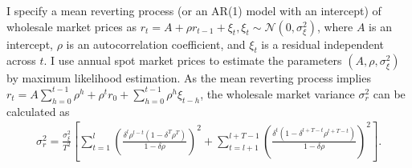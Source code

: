 \documentclass[12pt]{article}
\theoremstyle{definition} %
\begin{document}
I specify a mean reverting process (or an AR(1) model with an intercept) of wholesale market prices as $r_t = A + \rho r_{t-1} + \xi_t, \xi_t \sim \mathcal{N}(0,\sigma_{\xi}^2)$, where $A $ is an intercept, $\rho $ is an autocorrelation coefficient, and $\xi_t $ is a residual independent across $t$. I use annual spot market prices to estimate the parameters $(A,\rho,\sigma_{\xi}^2) $ by maximum likelihood estimation. As the mean reverting process implies $r_t = A \sum_{h=0}^{t-1} \rho^h + \rho^t r_0 + \sum_{h=0}^{t-1} \rho^h \xi_{t-h}$, the wholesale market variance $\sigma^2_r$ can be calculated as
\begin{eqnarray*}
\sigma^2_r = \frac{\sigma_{\xi}^2}{T^2} \left[\sum_{t=1}^l \left(\frac{\delta^l \rho^{l-t} (1-\delta^T \rho^T)}{1-\delta \rho} \right)^2 + \sum_{t=l+1}^{l+T-1} \left(\frac{\delta^t (1-\delta^{l+T-t} \rho^{l+T-t})}{1-\delta \rho} \right)^2 \right].
\end{eqnarray*}
\end{document}
